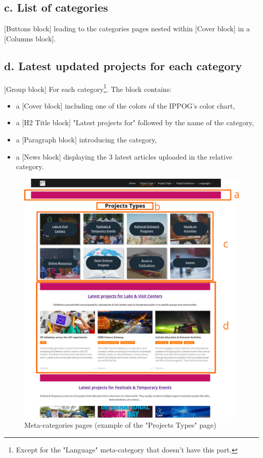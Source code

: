 \subsection*{c. List of categories}
[Buttons block] leading to the categories pages nested within [Cover block] in a [Columns block].

\subsection*{d. Latest updated projects for each category}
[Group block] For each category\footnote{Except for the "Language" meta-category that doesn't have this part.}. The block contains: 
\begin{itemize}
    \item a [Cover block] including one of the colors of the IPPOG's color chart,
    \item a [H2 Title block] "Latest projects for" followed by the name of the category,
    \item a [Paragraph block] introducing the category,
    \item a [News block] displaying the 3 latest articles uploaded in the relative category.
\end{itemize}

\begin{figure}[p]
    \centering
    \includegraphics[width=\linewidth]{Image/Architecture/structure_types.png}
    \caption{Meta-categories pages (example of the "Projects Types" page)}
    \label{fig:structure_metacategory}
\end{figure}

